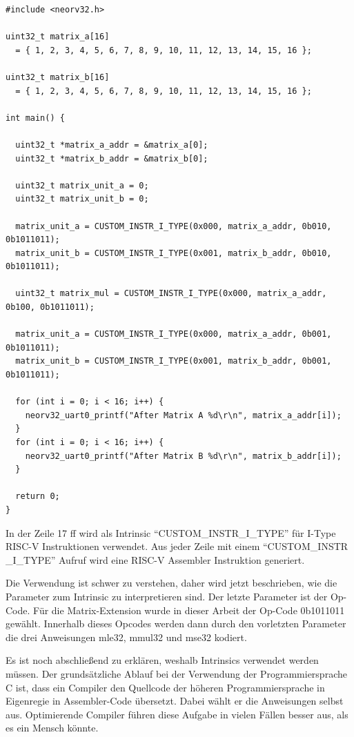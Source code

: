 \begin{lstlisting}[style=PseudoLang,caption={Hardwarebeschleunigte Multiplikation},captionpos=b]
#include <neorv32.h>

uint32_t matrix_a[16]
  = { 1, 2, 3, 4, 5, 6, 7, 8, 9, 10, 11, 12, 13, 14, 15, 16 };

uint32_t matrix_b[16]
  = { 1, 2, 3, 4, 5, 6, 7, 8, 9, 10, 11, 12, 13, 14, 15, 16 };

int main() {

  uint32_t *matrix_a_addr = &matrix_a[0];
  uint32_t *matrix_b_addr = &matrix_b[0];

  uint32_t matrix_unit_a = 0;
  uint32_t matrix_unit_b = 0;

  matrix_unit_a = CUSTOM_INSTR_I_TYPE(0x000, matrix_a_addr, 0b010, 0b1011011);
  matrix_unit_b = CUSTOM_INSTR_I_TYPE(0x001, matrix_b_addr, 0b010, 0b1011011);

  uint32_t matrix_mul = CUSTOM_INSTR_I_TYPE(0x000, matrix_a_addr, 0b100, 0b1011011);

  matrix_unit_a = CUSTOM_INSTR_I_TYPE(0x000, matrix_a_addr, 0b001, 0b1011011);
  matrix_unit_b = CUSTOM_INSTR_I_TYPE(0x001, matrix_b_addr, 0b001, 0b1011011);

  for (int i = 0; i < 16; i++) {
    neorv32_uart0_printf("After Matrix A %d\r\n", matrix_a_addr[i]);
  }
  for (int i = 0; i < 16; i++) {
    neorv32_uart0_printf("After Matrix B %d\r\n", matrix_b_addr[i]);
  }

  return 0;
}
\end{lstlisting}

In der Zeile 17 ff wird als Intrinsic ``CUSTOM\_INSTR\_I\_TYPE'' für I-Type RISC-V Instruktionen verwendet. Aus jeder Zeile mit einem ``CUSTOM\_INSTR \_I\_TYPE'' Aufruf wird eine RISC-V Assembler Instruktion generiert.

Die Verwendung ist schwer zu verstehen, daher wird jetzt beschrieben, wie die Parameter zum Intrinsic zu interpretieren sind. Der letzte Parameter ist der Op-Code. Für die Matrix-Extension wurde in dieser Arbeit der Op-Code 0b1011011 gewählt. Innerhalb dieses Opcodes werden dann durch den vorletzten Parameter die drei Anweisungen mle32, mmul32 und mse32 kodiert.

Es ist noch abschließend zu erklären, weshalb Intrinsics verwendet werden müssen. Der grundsätzliche Ablauf bei der Verwendung der Programmiersprache C ist, dass ein Compiler den Quellcode der höheren Programmiersprache in Eigenregie in Assembler-Code übersetzt. Dabei wählt er die Anweisungen selbst aus. Optimierende Compiler führen diese Aufgabe in vielen Fällen besser aus, als es ein Mensch könnte.

